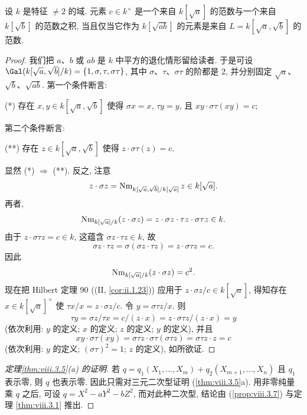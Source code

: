 \begin{lemma}\label{lem:viii.3.8}
设 $k$ 是特征 $\ne 2$ 的域. 元素 $c\in k^{\times}$ 是一个来自 $k[\sqrt{a}]$ 的范数与一个来自 $k[\sqrt{b}]$ 的范数之积, 当且仅当它作为 $k[\sqrt{ab}]$ 的元素是来自 $L=k[\sqrt{a},\sqrt{b}]$ 的范数.
\end{lemma}

\begin{proof}
我们把 $a$、$b$ 或 $ab$ 是 $k$ 中平方的退化情形留给读者. 于是可设 $\Gal(k[\sqrt{a},\sqrt{b}]/k)=\{1,\sigma,\tau,\sigma\tau\}$, 其中 $\sigma$、$\tau$、$\sigma\tau$ 的阶都是 $2$, 并分别固定 $\sqrt{a}$、$\sqrt{b}$、$\sqrt{ab}$. 第一个条件断言:

(*) 存在 $x,y\in k[\sqrt{a},\sqrt{b}]$ 使得 $\sigma x=x$, $\tau y=y$, 且 $xy\cdot\sigma\tau(xy)=c$;

第二个条件断言:

(**) 存在 $z\in k[\sqrt{a},\sqrt{b}]$ 使得 $z\cdot\sigma\tau(z)=c$.

显然 (*) $\Rightarrow$ (**). 反之, 注意
\[
z\cdot\sigma z=\operatorname{Nm}_{k[\sqrt{a},\sqrt{b}]/k[\sqrt{a}]}z\in k[\sqrt{a}].
\]
再者,
\[
\operatorname{Nm}_{k[\sqrt{a}]/k}(z\cdot\sigma z)=z\cdot\sigma z\cdot\tau z\cdot\sigma\tau z\in k.
\]
由于 $z\cdot\sigma\tau z=c\in k$, 这蕴含 $\sigma z\cdot\tau z\in k$, 故
\[
\sigma z\cdot\tau z=\sigma(\sigma z\cdot\tau z)=z\cdot\sigma\tau z=c.
\]
因此
\[
\operatorname{Nm}_{k[\sqrt{a}]/k}(z\cdot\sigma z)=c^{2}.
\]
现在把 Hilbert 定理 90 ((II, \ref{cor:ii.1.23})) 应用于 $z\cdot\sigma z/c\in k[\sqrt{a}]$, 得知存在 $x\in k[\sqrt{a}]^{\times}$ 使 $\tau x/x=z\cdot\sigma z/c$. 令 $y=\sigma\tau z/x$. 则
\[
\tau y=\sigma z/\tau x=c/(z\cdot x)=z\cdot\sigma\tau z/(z\cdot x)=y
\]
(依次利用: $y$ 的定义; $x$ 的定义; $z$ 的定义; $y$ 的定义), 并且
\[
xy\cdot\sigma\tau(xy)=\sigma\tau z\cdot\sigma\tau(\sigma\tau z)=\sigma\tau z\cdot z=c
\]
(依次利用: $y$ 的定义; $(\sigma\tau)^{2}=1$; $z$ 的定义), 如所欲证.
\end{proof}

\begin{proof}[定理\ref{thm:viii.3.5}(a) 的证明]
若 $q=q_1(X_1,\ldots,X_m)+q_2(X_{m+1},\ldots,X_n)$ 且 $q_1$ 表示零, 则 $q$ 也表示零. 因此只需对三元二次型证明 (\ref{thm:viii.3.5}a). 用非零纯量乘 $q$ 之后, 可设 $q=X^{2}-aY^{2}-bZ^{2}$, 而对此种二次型, 结论由 (\ref{prop:viii.3.7}) 与定理 \ref{thm:viii.3.1} 推出.
\end{proof}

